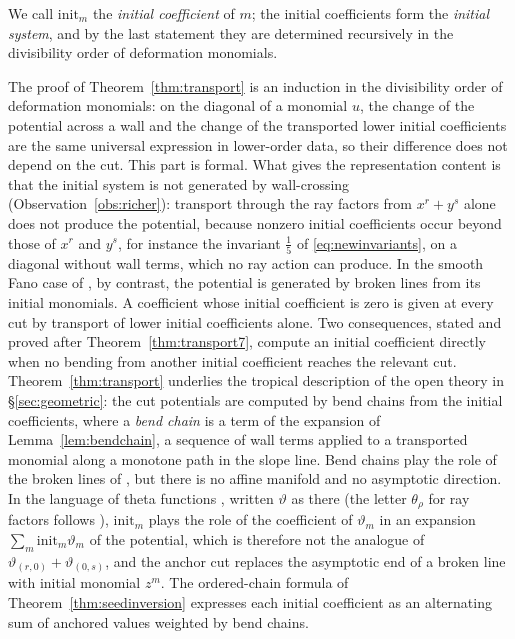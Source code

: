 \documentclass[11pt]{amsart}
\theoremstyle{definition}
\theoremstyle{remark}
\begin{document}
We call $\mathrm{init}_m$ the \emph{initial coefficient} of $m$; the initial
coefficients form the \emph{initial system}, and by the last statement they
are determined recursively in the divisibility order of deformation monomials.

The proof of Theorem~\ref{thm:transport} is an induction in the divisibility
order of deformation monomials: on
the diagonal of a monomial $u$, the change of the potential across a wall and
the change of the transported lower initial coefficients are the same universal
expression in lower-order data, so their difference does not depend on the
cut.  This part is formal.  What gives the representation content is that
the initial system is not generated by wall-crossing
(Observation~\ref{obs:richer}): transport through the ray factors from
$x^r+y^s$ alone does not produce the potential, because nonzero initial
coefficients occur beyond those of $x^r$ and $y^s$, for instance the invariant
$\tfrac15$ of \eqref{eq:newinvariants}, on a diagonal without wall terms, which
no ray action can produce.  In the smooth Fano case of \cite{Gross10,CPS}, by
contrast, the potential is generated by broken lines from its initial
monomials.  A coefficient whose initial
coefficient is zero is given at every cut by transport of lower initial
coefficients alone.  Two consequences, stated and proved after
Theorem~\ref{thm:transport7}, compute an initial coefficient directly when no
bending from another initial coefficient reaches the relevant cut.
Theorem~\ref{thm:transport} underlies the tropical description of the open
theory in \S\ref{sec:geometric}: the cut potentials are computed by bend chains
from the initial coefficients, where a \emph{bend chain} is a term of the
expansion of Lemma~\ref{lem:bendchain}, a sequence of wall terms applied to a
transported monomial along a monotone path in the slope line.  Bend chains
play the role of the broken lines of \cite{Gross10,CPS}, but there is no
affine manifold and no asymptotic direction.  In the language of theta
functions \cite{GHK15,GHKK}, written $\vartheta$ as there (the letter
$\theta_\rho$ for ray factors follows \cite{GPS10}), $\mathrm{init}_m$ plays
the role of the
coefficient of $\vartheta_m$ in an expansion $\sum_m\mathrm{init}_m\vartheta_m$
of the potential, which is therefore not the analogue of
$\vartheta_{(r,0)}+\vartheta_{(0,s)}$, and the anchor cut replaces the
asymptotic end of a broken line with initial monomial $z^m$.  The ordered-chain formula of
Theorem~\ref{thm:seedinversion} expresses each initial coefficient as an
alternating sum of anchored values weighted by bend chains.
\end{document}
